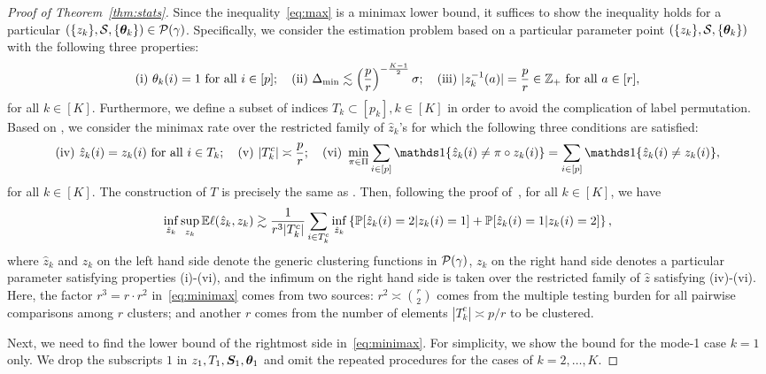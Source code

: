 \documentclass[lettersize,onecolumn,journal]{IEEEtran}
\theoremstyle{definition}
\theoremstyle{definition}
\begin{document}
\begin{proof}[Proof of Theorem~\ref{thm:stats}]
Since the inequality~\eqref{eq:max} is a minimax lower bound, it suffices to show the inequality holds for a particular $(\{z_k\}, \mathcal{S}, \{\boldsymbol{\theta}_k\}) \in \mathcal{P}(\gamma)$. Specifically, we consider the estimation problem based on a particular parameter point $(\{z_k\}, \mathcal{S}, \{\boldsymbol{\theta}_k\})$ with the following three properties:
\begin{equation}\label{eq:construction}
    \text{(i)}\  \theta_k(i)=1 \text{ for all }i\in[p]; \quad  \text{(ii)}\ 
    \Delta_{\min}\lesssim  \left({p\over r}\right)^{-\frac{K-1}{2}}\sigma; \quad  \text{(iii)}\ |z^{-1}_k(a)|={p \over r} \in \mathbb{Z}_+ \text{ for all }a\in[r],
\end{equation}
for all $k \in [K]$.
Furthermore, we define a subset of indices $T_k \subset [p_k], k \in [K]$ in order to avoid the complication of label permutation. Based on \citet[Proof of Theorem 6]{han2020exact}, we consider the minimax rate over the restricted family of $\hat z_k$'s for which the following three conditions are satisfied:
\begin{equation}
    \text{(iv)}\ \hat z_k(i)=z_k(i) \text{ for all }i\in T_k; \quad \text{(v)} \ |T^c_k|\asymp {p\over r}; \quad \text{(vi)}\ \min_{\pi\in \Pi}\sum_{i\in[p]}\ind\{\hat z_k(i) \neq \pi\circ z_k (i)\} = \sum_{i\in[p]}\ind\{\hat z_k(i) \neq  z_k (i)\},
\end{equation}
\normalsize
for all $k \in [K]$.
The construction of $T$ is precisely the same as \citet[Proof of Theorem 6]{han2020exact}. 
Then, following the proof of~\citet[Theorem 2]{gao2018community}, for all $k \in [K]$, we have
\begin{equation}\label{eq:minimax}
\inf_{\hat z_k}\sup_{z_k}\bbE \ell(\hat z_k, z_k) \gtrsim {1\over r^3 |T^c_k|}\sum_{i\in T^c_k}\inf_{\hat z_k}\left\{\bbP[\hat z_k(i)=2|z_k(i)=1] + \bbP[\hat z_k(i)=1|z_k(i)=2] \right\},
\end{equation}
where $\hat z_k$ and $z_k$ on the left hand side denote the generic clustering functions in $\mathcal{P}(\gamma)$, $z_k$ on the right hand side denotes a particular parameter satisfying properties (i)-(vi), and the infimum on the right hand side is taken over the restricted family of $\hat z$ satisfying (iv)-(vi). Here, the factor $r^3=r\cdot r^2$ in~\eqref{eq:minimax} comes from two sources: $r^2\asymp {r\choose 2}$ comes from the multiple testing burden for all pairwise comparisons among $r$ clusters; and another $r$ comes from the number of elements $|T^c_k|\asymp p/r$ to be clustered. 

Next, we need to find the lower bound of the rightmost side in~\eqref{eq:minimax}. For simplicity, we show the bound for the mode-1 case $k = 1$ only. We drop the subscripts $1$ in $z_1, T_1, \bm S_1, \boldsymbol{\theta}_1$ and omit the repeated procedures for the cases of $k = 2,\ldots, K$. 


\end{proof}
\end{document}
